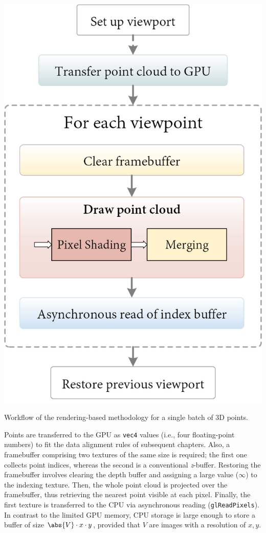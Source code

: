 \begin{marginfigure}[.2cm]
    \centering
    \includegraphics[width=\linewidth]{figs/multi_thermal_projection/occlusion_opengl.png}
    \caption{Workflow of the rendering-based methodology for a single batch of 3D points.}
    \label{fig:occlusion_opengl_zbuffer}
\end{marginfigure}
Points are transferred to the GPU as \verb|vec4| values (i.e., four floating-point numbers) to fit the data alignment rules of subsequent chapters. Also, a framebuffer comprising two textures of the same size is required; the first one collects point indices, whereas the second is a conventional \textit{z}-buffer. Restoring the framebuffer involves clearing the depth buffer and assigning a large value ($\infty$) to the indexing texture. Then, the whole point cloud is projected over the framebuffer, thus retrieving the nearest point visible at each pixel. Finally, the first texture is transferred to the CPU via asynchronous reading (\verb|glReadPixels|). In contrast to the limited GPU memory, CPU storage is large enough to store a buffer of size $\abs{V} \cdot x \cdot y$, provided that $V$ are images with a resolution of $x, y$.

